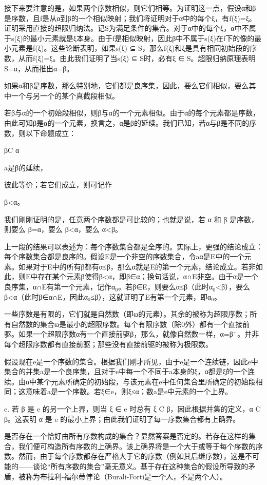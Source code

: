 \documentclass[12pt,a4paper]{ctexbook}
\theoremstyle{definition}
\theoremstyle{remark}
\begin{document}
{接下来要注意的是，如果两个序数相似，则它们相等。为证明这一点，假设α和β是序数，且f是从α到β的一个相似映射；我们将证明对于α中的每个ξ，有f(ξ)=ξ。证明采用直接的超限归纳法。记S为满足条件的集合。对于α中的每个ξ，α中不属于s(ξ)的最小元素就是ξ本身。由于f是相似映射，因此β中不属于s(ξ)在f下的像的最小元素是f(ξ)。这些论断表明，如果s(ξ) ⊆ S，那么f(ξ)和ξ是具有相同初始段的序数，从而f(ξ)=ξ。由此我们证明了当s(ξ) ⊆ S时，必有ξ ∈ S。超限归纳原理表明S=α，从而推出α=β。

如果α和β是序数，那么特别地，它们都是良序集，因此，要么它们相似，要么其中一个与另一个的某个真截段相似。

若β与α的一个初始段相似，则β与α的一个元素相似。由于α的每个元素都是序数，由此可知β是α的一个元素，换言之，α是β的延续。我们已知，若α与β是不同的序数，则以下命题成立：

βC α

a是β的延续，

彼此等价；若它们成立，则可记作

β<α。

我们刚刚证明的是，任意两个序数都是可比较的；也就是说，若 α 和 β 是序数，则要么 β=α，要么 β<α，要么 α<β。

上一段的结果可以表述为：每个序数集合都是全序的。实际上，更强的结论成立：每个序数集合都是良序的。假设E是一个非空的序数集合，令aα是E中的一个元素。如果对于E中的所有β都有α≤β，那么α就是E的第一个元素，结论成立。若非如此，则E中存在某个元素β使得β<α，即β∈α；换句话说，α∩E非空。由于α是一个良序集，α∩E有第一个元素，记作α$_{0}$。若β∈E，则要么α≤β（此时α$_{0}$<β），要么β<α（此时β∈α∩E，因此α$_{0}$≤β），这就证明了E有第一个元素，即α$_{0}$。

一些序数是有限的，它们就是自然数（即ω的元素）。其余的被称为超限序数；所有自然数的集合ω是最小的超限序数。每个有限序数（除0外）都有一个直接前驱。如果一个超限序数α有一个直接前驱β，那么，就像自然数一样，α=β$^{+}$。并非每个超限序数都有直接前驱；那些没有直接前驱的被称为极限数。

假设现在e是一个序数的集合。根据我们刚才所见，由于e是一个连续链，因此e中集合的并集a是一个良序集，且对于e中每一个不同于a本身的ξ，α都是ξ的一个连续。由α中某个元素所确定的初始段，与该元素在e中任何集合里所确定的初始段相同；这意味着a是一个序数。若ξ∈e，则ξ≤α；数a是e中元素的一个上界。

e. 若 β 是 e 的另一个上界，则当 ξ ∈ e 时总有 ξ C β，因此根据并集的定义，α C β。这表明 α 是 e 的最小上界；由此我们证明了每一序数集合都有上确界。

是否存在一个恰好由所有序数构成的集合？显然答案是否定的。若存在这样的集合，我们便可构造所有序数的上确界。该上确界将是一个大于或等于每个序数的序数。然而，由于每个序数都存在严格大于它的序数（例如其后继序数），这是不可能的——谈论“所有序数的集合”毫无意义。基于存在这种集合的假设所导致的矛盾，被称为布拉利-福尔蒂悖论（Burali-Forti是一个人，不是两个人）。

}
\end{document}
